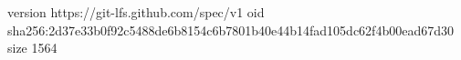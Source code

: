 version https://git-lfs.github.com/spec/v1
oid sha256:2d37e33b0f92c5488de6b8154c6b7801b40e44b14fad105dc62f4b00ead67d30
size 1564

